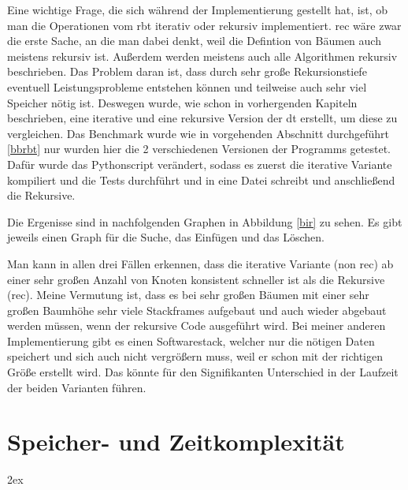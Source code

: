 \documentclass[11pt]{article}
\begin{document}
Eine wichtige Frage, die sich während der Implementierung gestellt hat, ist, ob man die Operationen vom \gls{rbt} iterativ oder rekursiv implementiert. 
\gls{rec} wäre zwar die erste Sache, an die man dabei denkt, weil die Defintion von Bäumen auch meistens rekursiv ist. Außerdem werden meistens auch alle Algorithmen rekursiv beschrieben. 
Das Problem daran ist, dass durch sehr große Rekursionstiefe eventuell Leistungsprobleme entstehen können und teilweise auch sehr viel Speicher nötig ist. 
Deswegen wurde, wie schon in vorhergenden Kapiteln beschrieben, eine iterative und eine rekursive Version der \gls{dt} erstellt, um diese zu vergleichen.
Das Benchmark wurde wie in vorgehenden Abschnitt durchgeführt \ref{bbrbt} nur wurden hier die 2 verschiedenen Versionen der Programms getestet. 
Dafür wurde das Pythonscript verändert, sodass es zuerst die iterative Variante kompiliert und die Tests durchführt und in eine Datei schreibt und anschließend die Rekursive. 

Die Ergenisse sind in nachfolgenden Graphen in Abbildung \ref{bir} zu sehen. Es gibt jeweils einen Graph für die Suche, das Einfügen und das Löschen.

Man kann in allen drei Fällen erkennen, dass die iterative Variante (non rec) ab einer sehr großen Anzahl von Knoten konsistent schneller ist als die Rekursive (rec).
Meine Vermutung ist, dass es bei sehr großen Bäumen mit einer sehr großen Baumhöhe sehr viele Stackframes aufgebaut und auch wieder abgebaut werden müssen, wenn der rekursive Code ausgeführt wird.
Bei meiner anderen Implementierung gibt es einen Softwarestack, welcher nur die nötigen Daten speichert und sich auch nicht vergrößern muss, weil er schon mit der richtigen Größe erstellt wird.
Das könnte für den Signifikanten Unterschied in der Laufzeit der beiden Varianten führen.

\section{Speicher- und Zeitkomplexität} \label{time}

\begingroup
\parindent 0pt
\parskip 2ex
\def\enotesize{\normalsize}
\theendnotes
\endgroup


\end{document}
